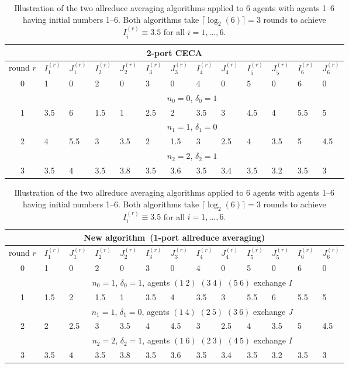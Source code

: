 \documentclass{article}
\newcommand{\ro}{{(r)}}
\theoremstyle{plain}
\theoremstyle{definition}
\begin{document}
\begin{table}[]
\label{table:CECA_example}
\centering
\begin{tabular}{c|ll|ll|ll|ll|ll|ll}
\hline
\multicolumn{13}{c}{2-port CECA}\\\hline
round
$r$& $I^\ro_1$& $J^\ro_1$& $I^\ro_2$& $J^\ro_2$& $I^\ro_3$& $J^\ro_3$& $I^\ro_4$& $J^\ro_4$& $I^\ro_5$& $J^\ro_5$& $I^\ro_6$& $J^\ro_6$\\\hline\hline
0  & 1    & 0    & 2    & 0    & 3    & 0    & 4    & 0    & 5    & 0    & 6    & 0    \\\hline
   & \multicolumn{12}{c}{$n_0 = 0$, $\delta_0 = 1$}                                    \\\hline
1  & 3.5  & 6    & 1.5  & 1    & 2.5  & 2    & 3.5  & 3    & 4.5  & 4    & 5.5  & 5    \\\hline
   & \multicolumn{12}{c}{$n_1 = 1$, $\delta_1 = 0$}                                    \\\hline
2  & 4    & 5.5  & 3    & 3.5  & 2    & 1.5  & 3    & 2.5  & 4    & 3.5  & 5    & 4.5  \\\hline
   & \multicolumn{12}{c}{$n_2 = 2$, $\delta_2 = 1$}                                    \\\hline
3  & 3.5  & 4    & 3.5  & 3.8  & 3.5  & 3.6  & 3.5  & 3.4  & 3.5  & 3.2  & 3.5  & 3    \\\hline\hline
\end{tabular}
\medskip

\begin{tabular}{c|ll|ll|ll|ll|ll|ll}
\hline
\multicolumn{13}{c}{New algorithm~(1-port allreduce averaging)}\\\hline
round
$r$& $I^\ro_1$& $J^\ro_1$& $I^\ro_2$& $J^\ro_2$& $I^\ro_3$& $J^\ro_3$& $I^\ro_4$& $J^\ro_4$& $I^\ro_5$& $J^\ro_5$& $I^\ro_6$& $J^\ro_6$   \\\hline\hline
0  & 1    & 0    & 2    & 0    & 3    & 0    & 4    & 0    & 5    & 0    & 6    & 0       \\\hline
   & \multicolumn{12}{c}{$n_0 = 1$, $\delta_0 = 1$, agents $(1~2)$ $(3~4)$ $(5~6)$ exchange $I$} \\\hline
1  & 1.5  & 2    & 1.5  & 1    & 3.5  & 4    & 3.5  & 3    & 5.5  & 6    & 5.5  & 5       \\\hline
   & \multicolumn{12}{c}{$n_1 = 1$, $\delta_1 = 0$, agents $(1~4)$ $(2~5)$ $(3~6)$ exchange $J$} \\\hline
2  & 2    & 2.5  & 3    & 3.5  & 4    & 4.5  & 3    & 2.5  & 4    & 3.5  & 5    & 4.5     \\\hline
   & \multicolumn{12}{c}{$n_2 = 2$, $\delta_2 = 1$, agents $(1~6)$ $(2~3)$ $(4~5)$ exchange $I$} \\\hline
3  & 3.5  & 4    & 3.5  & 3.8  & 3.5  & 3.6  & 3.5  & 3.4  & 3.5  & 3.2  & 3.5  & 3       \\\hline
\end{tabular}
\caption{Illustration of the two allreduce averaging algorithms applied to 6 agents with agents 1--6 having initial numbers 1--6. Both algorithms take $\lceil\log_2(6)\rceil=3$ rounds to achieve $I^{(r)}_i\equiv 3.5$ for all $i=1,\dots, 6$.}
\end{table}
\end{document}
